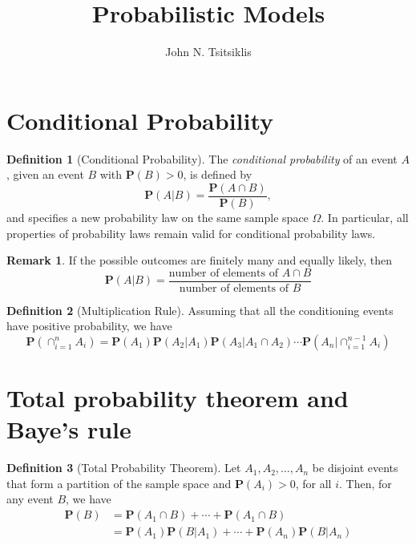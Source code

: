 \documentclass{tufte-handout}
\author{John N. Tsitsiklis}
\title{Probabilistic Models}
\theoremstyle{definition} \newtheorem{definition}{Definition}
\theoremstyle{definition} \newtheorem{remark}{Remark}
\newcommand{\prob}[1]{\mathbf{P}\left(#1\right)}
\begin{document}
\maketitle
\section{Conditional Probability}
\begin{definition}[Conditional Probability]
  The \emph{conditional probability} of an event $A$, given an event $B$
  with $\prob{B} > 0$, is defined by
  \begin{equation*}
    \prob{A | B} = \frac{\prob{A \cap B}}{\prob{B}},
  \end{equation*}
  and specifies a new probability law on the same sample space $\Omega$.
  In particular, all properties of probability laws remain valid for
  conditional probability laws.
\end{definition}

\begin{remark}
  If the possible outcomes are finitely many and equally likely, then
  \begin{equation*}
    \prob{A | B} = \frac{\text{number of elements of } A \cap B}
    {\text{number of elements of } B}
  \end{equation*}
\end{remark}

\begin{definition}[Multiplication Rule]
  Assuming that all the conditioning events have positive probability, we
  have
  \begin{equation*}
    \prob{\cap_{i=1}^n A_i} = \prob{A_1} \prob{A_2 | A_1}
    \prob{A_3 | A_1 \cap A_2} \cdots \prob{A_n | \cap_{i=1}^{n-1} A_i}
  \end{equation*}
\end{definition}

\section{Total probability theorem and Baye's rule}
\begin{definition}[Total Probability Theorem]
  Let $A_1, A_2, \ldots, A_n$ be disjoint events that form a partition of
  the sample space and $\prob{A_i} > 0$, for all $i$. Then, for any event
  $B$, we have
  \begin{align*}
    \prob{B} & = \prob{A_1 \cap B} + \cdots + \prob{A_1 \cap B} \\
             & = \prob{A_1} \prob{B | A_1} + \cdots + \prob{A_n}
               \prob{B | A_n}
  \end{align*}
\end{definition}
\end{document}
